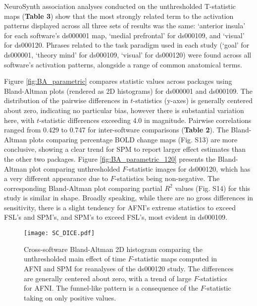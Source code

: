 NeuroSynth association analyses conducted on the unthresholded T-statistic maps (\textbf{Table 3}) show that the most strongly related term to the activation patterns displayed across all three sets of results was the same: `anterior insula' for each software's ds000001 map, `medial prefrontal' for ds000109, and `visual' for ds000120. Phrases related to the task paradigm used in each study (`goal' for ds000001, `theory mind' for ds000109, `visual' for ds000120) were found across all software's activation patterns, alongside a range of common anatomical terms. 

Figure \ref{fig:BA_parametric} compares statistic values across packages using Bland-Altman plots (rendered as 2D histograms) for ds000001 and ds000109. The distribution of the pairwise differences in $t$-statistics (y-axes) is generally centered about zero, indicating no particular bias, however there is substantial variation here, with $t$-statistic differences exceeding 4.0 in magnitude. Pairwise correlations ranged from 0.429 to 0.747 for inter-software comparisons (\textbf{Table 2}). The Bland-Altman plots comparing percentage BOLD change maps (Fig. S13) are more conclusive, showing a clear trend for SPM to report larger effect estimates than the other two packages. Figure \ref{fig:BA_parametric_120} presents the Bland-Altman plot comparing unthresholded $F$-statistic images for ds000120, which has a very different appearance due to $F$-statistics being non-negative. The corresponding Bland-Altman plot comparing partial $R^{2}$ values (Fig. S14) for this study is similar in shape. Broadly speaking, while there are no gross differences in sensitivity, there is a slight tendency for AFNI's extreme statistics to exceed FSL's and SPM's, and SPM's to exceed FSL's, most evident in ds000109. 

\begin{sidewaysfigure}[htbp]
\centering
	\texttt{[image: SC\_DICE.pdf]}	
\caption{Cross-software Bland-Altman 2D histogram comparing the unthresholded main effect of time $F$-statistic maps computed in AFNI and SPM for reanalyses of the ds000120 study. The differences are generally centered about zero, with a trend of large $F$-statistics for AFNI. The funnel-like pattern is a consequence of the $F$-statistic taking on only positive values.}
\label{fig:DICE}
\end{sidewaysfigure}

